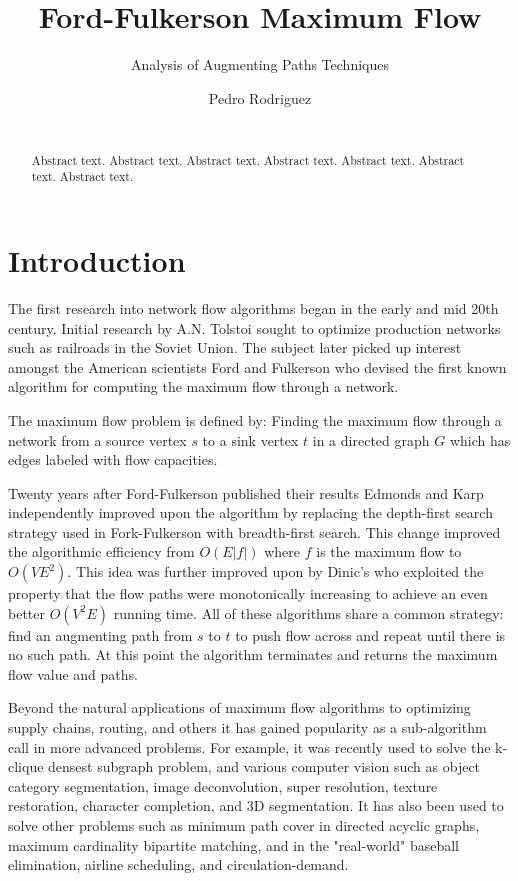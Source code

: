 \documentclass{acm_proc_article-sp}
\begin{document}
\title{Ford-Fulkerson Maximum Flow}
\subtitle{Analysis of Augmenting Paths Techniques}

\author{
\alignauthor
Pedro Rodriguez\\
       \\
}

\maketitle
\begin{abstract}
Abstract text. Abstract text. Abstract text. Abstract text. Abstract text. Abstract text. Abstract text. 
\end{abstract}

\section{Introduction}
The first research into network flow algorithms began in the early and mid 20th century. Initial research by A.N. Tolstoi sought to optimize production networks such as railroads in the Soviet Union\cite{Schrijver:2002dj}. The subject later picked up interest amongst the American scientists Ford and Fulkerson who devised the first known algorithm for computing the maximum flow through a network\cite{Ford:1956vc}. 

The maximum flow problem is defined by: Finding the maximum flow through a network from a source vertex $s$ to a sink vertex $t$ in a directed graph $G$ which has edges labeled with flow capacities.

Twenty years after Ford-Fulkerson published their results Edmonds and Karp independently improved upon the algorithm by replacing the depth-first search strategy used in Fork-Fulkerson with breadth-first search\cite{Edmonds:1972ht}. This change improved the algorithmic efficiency from $O(E|f|)$ where $f$ is the maximum flow to $O(VE^2)$. This idea was further improved upon by Dinic's who exploited the property that the flow paths were monotonically increasing to achieve an even better $O(V^2E)$ running time\cite{Dinic:lsM40ti7}. All of these algorithms share a common strategy: find an augmenting path from $s$ to $t$ to push flow across and repeat until there is no such path. At this point the algorithm terminates and returns the maximum flow value and paths.

Beyond the natural applications of maximum flow algorithms to optimizing supply chains, routing, and others it has gained popularity as a sub-algorithm call in more advanced problems. For example, it was recently used to solve the k-clique densest subgraph problem\cite{tsourakakis2015k}, and various computer vision such as object category segmentation, image deconvolution, super resolution, texture restoration, character completion, and 3D segmentation\cite{Verma:2012gs}. It has also been used to solve other problems such as minimum path cover in directed acyclic graphs, maximum cardinality bipartite matching, and in the "real-world" baseball elimination, airline scheduling, and circulation-demand\cite{wiki:maxflow}.
\end{document}
